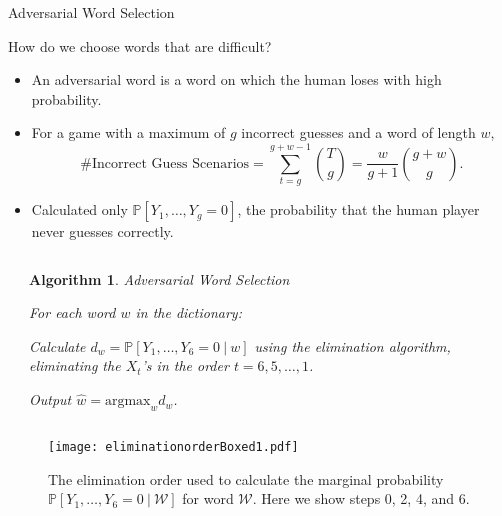 \documentclass[final]{beamer}
\newtheorem{alg}{Algorithm}
\newcommand{\argmax}{\text{argmax}}
\begin{document}
{\begin{frame}{}
\begin{center}
\begin{columns}[t]
\begin{column}{0.32\textwidth}
     \begin{block}{\huge Adversarial Word Selection}
\vspace{1cm}

{\Large How do we choose words that are difficult?}
\begin{itemize}
\item An adversarial word is a word on which the human loses with high probability. 

\item For a game with a maximum of $g$ incorrect guesses and a word of length $w$, 
{\large
\[
 \text{\# Incorrect Guess Scenarios} = \sum_{t = g}^{g+w-1}\binom{T}{g} = \frac{w}{g+1}\binom{g+w}{g}.
\]
}

\item Calculated only $\mathbb{P}[Y_1,\ldots,Y_g = 0]$, the probability that the human player never guesses correctly.
\end{itemize}

\vspace{1cm}

\begin{columns}
\begin{column}[b]{0.1\textwidth}
\end{column}
\begin{column}[b]{0.8\textwidth}

{\huge
\begin{alg}{{\large Adversarial Word Selection}}
\begin{enumerate}{\large
\item For each word $w$ in the dictionary:
\begin{enumerate} {\normalsize
\item Calculate $d_w =\mathbb{P}[Y_1, \ldots, Y_6 = 0\ |\ w]$ using the elimination algorithm, eliminating the $X_t$'s in the order $t = 6,5,\ldots, 1$.}
\end{enumerate}
\item Output $\hat w = \argmax_{w} d_w$.}
\end{enumerate}
\end{alg}}
\end{column}
\begin{column}[b]{0.1\textwidth}
\end{column}
\end{columns}

\vspace{.5cm}

\begin{figure}
\texttt{[image: eliminationorderBoxed1.pdf]}
\caption{The elimination order used to calculate the marginal probability $\mathbb{P}[Y_1,\ldots,Y_6 = 0 \ | \ \mathcal{W}]$ for word $\mathcal{W}$. Here we show steps 0, 2, 4, and 6.}
\end{figure}


\end{block}
\end{column}
\end{columns}
\end{center}
\end{frame}}
\end{document}
